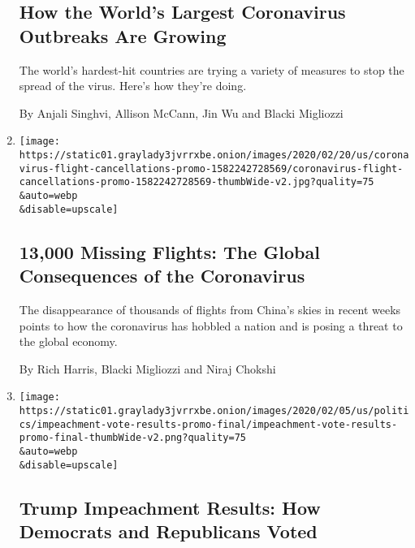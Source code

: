 \begin{enumerate}
  \hypertarget{how-the-worlds-largest-coronavirus-outbreaks-are-growing}{%
  \subsection{How the World's Largest Coronavirus Outbreaks Are
  Growing}\label{how-the-worlds-largest-coronavirus-outbreaks-are-growing}}

  The world's hardest-hit countries are trying a variety of measures to
  stop the spread of the virus. Here's how they're doing.

  By Anjali Singhvi, Allison McCann, Jin Wu and Blacki Migliozzi
\item
  \href{/interactive/2020/02/21/business/coronavirus-airline-travel.html}{}

  \texttt{[image: https://static01.graylady3jvrrxbe.onion/images/2020/02/20/us/coronavirus-flight-cancellations-promo-1582242728569/coronavirus-flight-cancellations-promo-1582242728569-thumbWide-v2.jpg?quality=75\\\&auto=webp\\\&disable=upscale]}

  \hypertarget{13000-missing-flights-the-global-consequences-of-the-coronavirus}{%
  \subsection{13,000 Missing Flights: The Global Consequences of the
  Coronavirus}\label{13000-missing-flights-the-global-consequences-of-the-coronavirus}}

  The disappearance of thousands of flights from China's skies in recent
  weeks points to how the coronavirus has hobbled a nation and is posing
  a threat to the global economy.

  By Rich Harris, Blacki Migliozzi and Niraj Chokshi
\item
  \href{/interactive/2020/02/05/us/politics/impeachment-vote-results.html}{}

  \texttt{[image: https://static01.graylady3jvrrxbe.onion/images/2020/02/05/us/politics/impeachment-vote-results-promo-final/impeachment-vote-results-promo-final-thumbWide-v2.png?quality=75\\\&auto=webp\\\&disable=upscale]}

  \hypertarget{trump-impeachment-results-how-democrats-and-republicans-voted}{%
  \subsection{Trump Impeachment Results: How Democrats and Republicans
  Voted}\label{trump-impeachment-results-how-democrats-and-republicans-voted}}


\end{enumerate}
